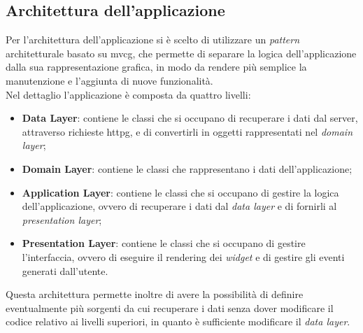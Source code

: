 \subsection{Architettura dell'applicazione}
\label{subsec:architettura-app}

Per l'architettura dell'applicazione si è scelto di utilizzare un \emph{pattern} architetturale basato su \gls{mvcg}\glsoccur, che permette di separare la logica dell'applicazione dalla sua rappresentazione grafica, in modo da rendere più semplice la manutenzione e l'aggiunta di nuove funzionalità.\\
Nel dettaglio l'applicazione è composta da quattro livelli\cite{site:app-architecture}:
\begin{itemize}
    \item \textbf{Data Layer}: contiene le classi che si occupano di recuperare i dati dal server, attraverso richieste \gls{httpg}\glsoccur, e di convertirli in oggetti rappresentati nel \emph{domain layer};
    \item \textbf{Domain Layer}: contiene le classi che rappresentano i dati dell'applicazione;
    \item \textbf{Application Layer}: contiene le classi che si occupano di gestire la logica dell'applicazione, ovvero di recuperare i dati dal \emph{data layer} e di fornirli al \emph{presentation layer};
    \item \textbf{Presentation Layer}: contiene le classi che si occupano di gestire l'interfaccia, ovvero di eseguire il rendering dei \emph{widget} e di gestire gli eventi generati dall'utente.
\end{itemize}
Questa architettura permette inoltre di avere la possibilità di definire eventualmente più sorgenti da cui recuperare i dati senza dover modificare il codice relativo ai livelli superiori, in quanto è sufficiente modificare il \emph{data layer}.\\

